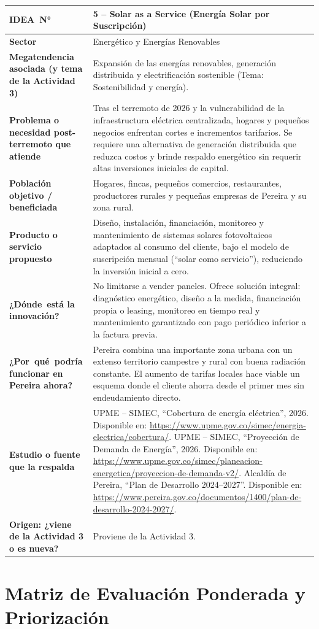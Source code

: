 \documentclass[11pt,a4paper]{article}
\newcommand{\fichaactividad}[9]{%
    \def\fIdea{#1}%
    \def\fSector{#2}%
    \def\fMega{#3}%
    \def\fProb{#4}%
    \def\fPobl{#5}%
    \def\fProd{#6}%
    \def\fInno{#7}%
    \def\fPere{#8}%
    \def\fFuen{#9}%
    \fichaactividadb%
}
\newcommand{\fichaactividadb}[1]{%
\begin{table}[H]
\centering
\sffamily
\renewcommand{\arraystretch}{1.52}
\setlength{\tabcolsep}{9pt}
\small
\begin{tabularx}{\textwidth}{|>{\centering\arraybackslash\bfseries\color{white}\columncolor{coloractualficha}\hsize=0.32\hsize}X|>{\arraybackslash\hsize=0.68\hsize}X|}
\hline
\mbox{IDEA N°} & \cellcolor{bgactualficha}\textbf{\color{coloractualficha}\fIdea} \\
\hline
Sector & \fSector \\
\hline
Megatendencia asociada (y tema de la Actividad 3) & \fMega \\
\hline
Problema o necesidad post-terremoto que atiende & \fProb \\
\hline
Población objetivo / beneficiada & \fPobl \\
\hline
Producto o servicio propuesto & \fProd \\
\hline
\mbox{¿Dónde está} la innovación? & \fInno \\
\hline
\mbox{¿Por qué podría} funcionar en Pereira ahora? & \fPere \\
\hline
Estudio o fuente que la respalda & \fFuen \\
\hline
Origen: ¿viene de la Actividad 3 o es nueva? & #1 \\
\hline
\end{tabularx}
\end{table}
}
\begin{document}
\fichaactividad
{5 -- Solar as a Service (Energía Solar por Suscripción)}
{Energético y Energías Renovables}
{Expansión de las energías renovables, generación distribuida y electrificación sostenible (Tema: Sostenibilidad y energía).}
{Tras el terremoto de 2026 y la vulnerabilidad de la infraestructura eléctrica centralizada, hogares y pequeños negocios enfrentan cortes e incrementos tarifarios. Se requiere una alternativa de generación distribuida que reduzca costos y brinde respaldo energético sin requerir altas inversiones iniciales de capital.}
{Hogares, fincas, pequeños comercios, restaurantes, productores rurales y pequeñas empresas de Pereira y su zona rural.}
{Diseño, instalación, financiación, monitoreo y mantenimiento de sistemas solares fotovoltaicos adaptados al consumo del cliente, bajo el modelo de suscripción mensual (``solar como servicio''), reduciendo la inversión inicial a cero.}
{No limitarse a vender paneles. Ofrece solución integral: diagnóstico energético, diseño a la medida, financiación propia o leasing, monitoreo en tiempo real y mantenimiento garantizado con pago periódico inferior a la factura previa.}
{Pereira combina una importante zona urbana con un extenso territorio campestre y rural con buena radiación constante. El aumento de tarifas locales hace viable un esquema donde el cliente ahorra desde el primer mes sin endeudamiento directo.}
{UPME -- SIMEC, ``Cobertura de energía eléctrica'', 2026. Disponible en: \url{https://www.upme.gov.co/simec/energia-electrica/cobertura/}. \newline
UPME -- SIMEC, ``Proyección de Demanda de Energía'', 2026. Disponible en: \url{https://www.upme.gov.co/simec/planeacion-energetica/proyeccion-de-demanda-v2/}. \newline
Alcaldía de Pereira, ``Plan de Desarrollo 2024--2027''. Disponible en: \url{https://www.pereira.gov.co/documentos/1400/plan-de-desarrollo-2024-2027/}.}
{Proviene de la Actividad 3.}

\newpage
\section{Matriz de Evaluación Ponderada y Priorización}
\end{document}
